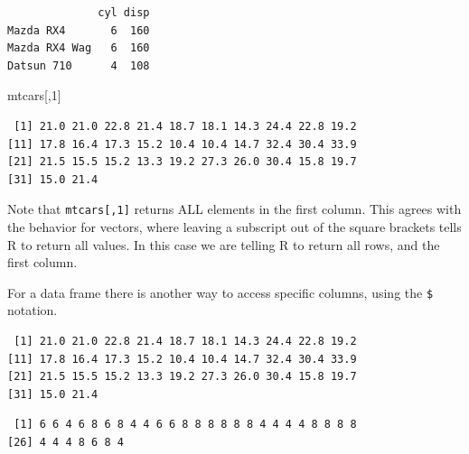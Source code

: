 \documentclass[
]{krantz}
\makeatletter
\newenvironment{Shaded}{\begin{snugshade}}{\end{snugshade}}
\newcommand{\DecValTok}[1]{\textcolor[rgb]{0.06,0.06,0.06}{#1}}
\newcommand{\NormalTok}[1]{#1}
\newcommand{\OperatorTok}[1]{\textcolor[rgb]{0.43,0.43,0.43}{\textbf{#1}}}
\newcommand{\StringTok}[1]{\textcolor[rgb]{0.5,0.5,0.5}{#1}}
\newenvironment{kframe}{%
\medskip{}
\setlength{\fboxsep}{.8em}
 \def\at@end@of@kframe{}%
 \ifinner\ifhmode%
  \def\at@end@of@kframe{\end{minipage}}%
  \begin{minipage}{\columnwidth}%
 \fi\fi%
 \def\FrameCommand##1{\hskip\@totalleftmargin \hskip-\fboxsep
 \colorbox{shadecolor}{##1}\hskip-\fboxsep
     \hskip-\linewidth \hskip-\@totalleftmargin \hskip\columnwidth}%
 \MakeFramed {\advance\hsize-\width
   \@totalleftmargin\z@ \linewidth\hsize
   \@setminipage}}%
 {\par\unskip\endMakeFramed%
 \at@end@of@kframe}
\renewenvironment{Shaded}{\begin{kframe}}{\end{kframe}}
\makeatother
\begin{document}
\begin{verbatim}
              cyl disp
Mazda RX4       6  160
Mazda RX4 Wag   6  160
Datsun 710      4  108
\end{verbatim}

\begin{Shaded}
\begin{Highlighting}[]
\NormalTok{mtcars[,}\DecValTok{1}\NormalTok{]}
\end{Highlighting}
\end{Shaded}

\begin{verbatim}
 [1] 21.0 21.0 22.8 21.4 18.7 18.1 14.3 24.4 22.8 19.2
[11] 17.8 16.4 17.3 15.2 10.4 10.4 14.7 32.4 30.4 33.9
[21] 21.5 15.5 15.2 13.3 19.2 27.3 26.0 30.4 15.8 19.7
[31] 15.0 21.4
\end{verbatim}

Note that \texttt{mtcars{[},1{]}} returns ALL elements in the first column. This agrees with the behavior for vectors, where leaving a subscript out of the square brackets tells R to return all values. In this case we are telling R to return all rows, and the first column.

For a data frame there is another way to access specific columns, using the \texttt{\$} notation.

\begin{Shaded}
\end{Shaded}

\begin{verbatim}
 [1] 21.0 21.0 22.8 21.4 18.7 18.1 14.3 24.4 22.8 19.2
[11] 17.8 16.4 17.3 15.2 10.4 10.4 14.7 32.4 30.4 33.9
[21] 21.5 15.5 15.2 13.3 19.2 27.3 26.0 30.4 15.8 19.7
[31] 15.0 21.4
\end{verbatim}

\begin{Shaded}
\end{Shaded}

\begin{verbatim}
 [1] 6 6 4 6 8 6 8 4 4 6 6 8 8 8 8 8 8 4 4 4 4 8 8 8 8
[26] 4 4 4 8 6 8 4
\end{verbatim}
\end{document}
